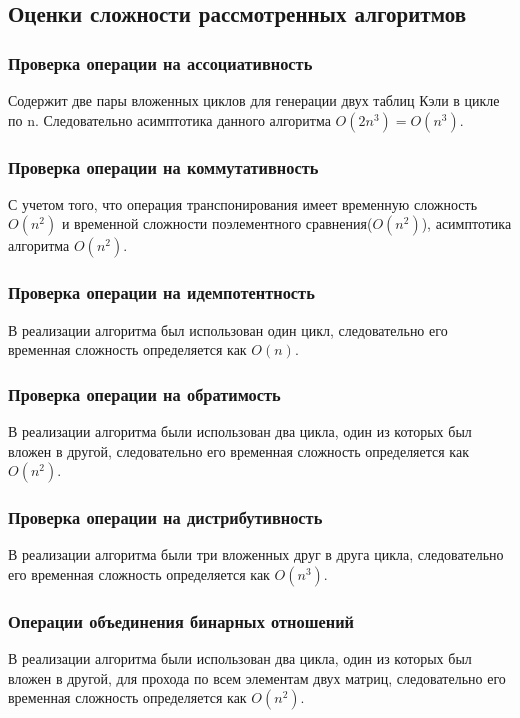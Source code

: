 \documentclass[spec, och, labwork]{shiza}
\begin{document}
\subsection{Оценки сложности рассмотренных алгоритмов}

    \subsubsection{Проверка операции на ассоциативность}
            Содержит две пары вложенных циклов для генерации двух таблиц Кэли в цикле по n. Следовательно асимптотика данного алгоритма $O(2n^3) = O(n^3)$.

    \subsubsection{Проверка операции на коммутативность}
            С учетом того, что операция транспонирования имеет временную сложность $O(n^2)$ и временной сложности поэлементного сравнения($O(n^2)$), асимптотика алгоритма $O(n^2)$.

    \subsubsection{Проверка операции на идемпотентность}
            В реализации алгоритма был использован один цикл, следовательно его временная сложность определяется как $O(n)$.

    \subsubsection{Проверка операции на обратимость}
            В реализации алгоритма были использован два цикла, один из которых был вложен в другой, следовательно его временная сложность определяется как $O(n^2)$.

    \subsubsection{Проверка операции на дистрибутивность}
            В реализации алгоритма были три вложенных друг в друга цикла, следовательно его временная сложность определяется как $O(n^3)$.

    \subsubsection{Операции объединения бинарных отношений}
            В реализации алгоритма были использован два цикла, один из которых был вложен в другой, для прохода по всем элементам двух матриц, следовательно его временная сложность определяется как $O(n^2)$.
\end{document}
